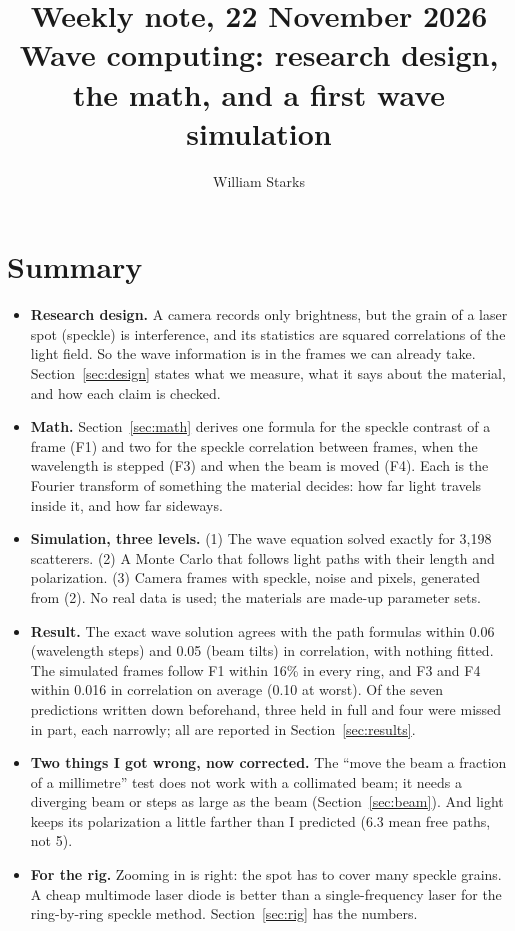 \documentclass[11pt]{article}
\title{Weekly note, 22 November 2026\\[2pt]\large Wave computing: research design, the math, and a first wave simulation}
\author{William Starks}
\date{}
\newcommand{\fwN}{3{,}198}
\newcommand{\fwSpecDiff}{0.06}
\newcommand{\fwTiltDiff}{0.05}
\newcommand{\polDist}{6.3}
\newcommand{\mWorstMulti}{16}
\newcommand{\wlRms}{0.016}
\newcommand{\beamWorst}{0.10}
\begin{document}
\maketitle

\section*{Summary}
\begin{itemize}
\item \textbf{Research design.} A camera records only brightness, but the grain of a laser spot (speckle) is
  interference, and its statistics are squared correlations of the light field. So the wave information is in the
  frames we can already take. Section~\ref{sec:design} states what we measure, what it says about the material, and how
  each claim is checked.
\item \textbf{Math.} Section~\ref{sec:math} derives one formula for the speckle contrast of a frame (F1) and two for the
  speckle correlation between frames, when the wavelength is stepped (F3) and when the beam is moved (F4). Each is the
  Fourier transform of something the material decides: how far light travels inside it, and how far sideways.
\item \textbf{Simulation, three levels.} (1) The wave equation solved exactly for \fwN{} scatterers. (2) A Monte Carlo
  that follows light paths with their length and polarization. (3) Camera frames with speckle, noise and pixels,
  generated from (2). No real data is used; the materials are made-up parameter sets.
\item \textbf{Result.} The exact wave solution agrees with the path formulas within \fwSpecDiff{} (wavelength steps) and
  \fwTiltDiff{} (beam tilts) in correlation, with nothing fitted. The simulated frames follow F1 within
  \mWorstMulti\% in every ring, and F3 and F4 within \wlRms{} in correlation on average (\beamWorst{} at worst).
  Of the seven predictions written down beforehand, three held in full and four were missed in part, each narrowly;
  all are reported in Section~\ref{sec:results}.
\item \textbf{Two things I got wrong, now corrected.} The ``move the beam a fraction of a millimetre'' test does not
  work with a collimated beam; it needs a diverging beam or steps as large as the beam (Section~\ref{sec:beam}). And
  light keeps its polarization a little farther than I predicted (\polDist{} mean free paths, not 5).
\item \textbf{For the rig.} Zooming in is right: the spot has to cover many speckle grains. A cheap multimode laser
  diode is better than a single-frequency laser for the ring-by-ring speckle method. Section~\ref{sec:rig} has the
  numbers.
\end{itemize}
\end{document}

